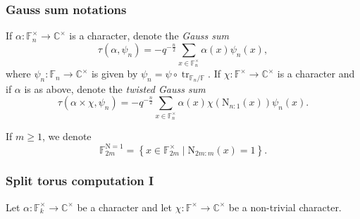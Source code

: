 \documentclass[12pt, reqno]{amsart}
\theoremstyle{definition}
\theoremstyle{definition}
\theoremstyle{definition}
\newcommand{\cComplex}{\mathbb{C}}
\newcommand{\multiplicativegroup}[1]{#1^{\times}}
\newcommand{\fieldCharacter}{\psi}
\newcommand{\trace}{\operatorname{tr}}
\newcommand{\FieldNorm}[2]{\mathrm{N}_{#1:#2}}
\newcommand{\aFieldNorm}{\mathrm{N}}
\newcommand{\finiteField}{\mathbb{F}}
\newcommand{\finiteFieldExtension}[1]{\finiteField_{#1}}
\newcommand{\NormOneGroup}[1]{\finiteFieldExtension{#1}^{\aFieldNorm = 1}}
\begin{document}
\subsubsection{Gauss sum notations}
If $\alpha \colon \multiplicativegroup{\finiteFieldExtension{n}} \to \multiplicativegroup{\cComplex}$ is a character, denote the \emph{Gauss sum} $$\tau\left(\alpha, \fieldCharacter_n\right) = -q^{-\frac{n}{2}}\sum_{x \in \multiplicativegroup{\finiteFieldExtension{n}}} \alpha\left(x\right) \fieldCharacter_n\left(x\right),$$
where $\fieldCharacter_n \colon \finiteFieldExtension{n} \to \multiplicativegroup{\cComplex}$ is given by $\fieldCharacter_n = \fieldCharacter \circ \trace_{\finiteFieldExtension{n} \slash \finiteField}$. If $\chi \colon \multiplicativegroup{\finiteField} \to \multiplicativegroup{\cComplex}$ is a character and if $\alpha$ is as above, denote the \emph{twisted Gauss sum}
$$\tau\left(\alpha \times \chi, \fieldCharacter_n\right) = -q^{-\frac{n}{2}}\sum_{x \in \multiplicativegroup{\finiteFieldExtension{n}}} \alpha\left(x\right) \chi\left( \FieldNorm{n}{1}\left(x\right)\right) \fieldCharacter_n\left(x\right).$$

If $m \ge 1$, we denote 
$$\NormOneGroup{2m} = \left\{ x \in \multiplicativegroup{\finiteFieldExtension{2m}} \mid \FieldNorm{2m}{m}\left(x\right)= 1\right\}.$$

\subsubsection{Split torus computation I}
Let $\alpha \colon \multiplicativegroup{\finiteFieldExtension{k}} \to \multiplicativegroup{\cComplex}$ be a character and let $\chi \colon \multiplicativegroup{\finiteField} \to \multiplicativegroup{\cComplex}$ be a non-trivial character.
\end{document}
